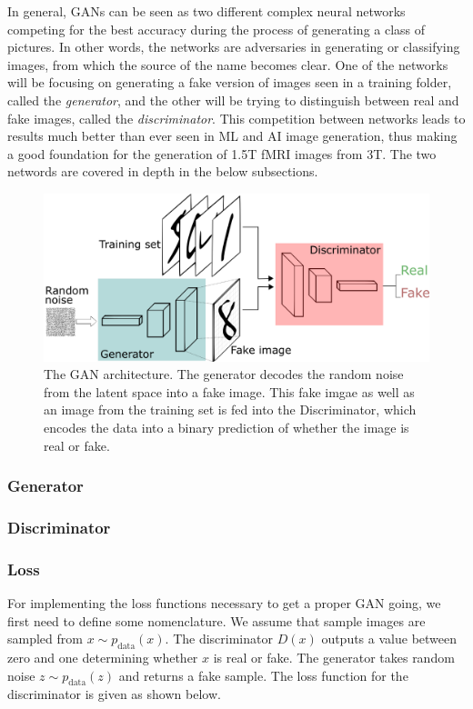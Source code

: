\documentclass[12pt, fleqn, titlepage]{article}
\begin{document}
In general, GANs can be seen as two different complex neural networks competing for the best accuracy during  the process of generating a class of pictures. In other words, the networks are adversaries in generating or classifying images, from which the source of the name becomes clear. One of the networks will be focusing on generating a fake version of images seen in a training folder, called the \textit{generator}, and the other will be trying to distinguish between real and fake images, called the \textit{discriminator}. This competition between networks leads to results much better than ever seen in ML and AI image generation, thus making a good foundation for the generation of 1.5T fMRI images from 3T. The two networds are covered in depth in the below subsections.
\begin{figure}[H]
	\centering
	\includegraphics[width=0.7\linewidth]{"imgs/GAN architecture"}
	\caption{The GAN architecture. The generator decodes the random noise from the latent space into a fake image. This fake imgae as well as an image from the training set is fed into the Discriminator, which encodes the data into a binary prediction of whether the image is real or fake.}
	\label{fig:gan-architecture}
\end{figure}


\subsubsection{Generator}


\subsubsection{Discriminator}


\subsubsection{Loss}
For implementing the loss functions necessary to get a proper GAN going, we first need to define some nomenclature. We assume that sample images are sampled from $x \sim p_{\text {data}}(x)$. The discriminator $D(x)$ outputs a value between zero and one determining whether $x$ is real or fake. The generator takes random noise $z \sim p_{\text {data}}(z)$ and returns a fake sample. The loss function for the discriminator is given as shown below.
\end{document}
